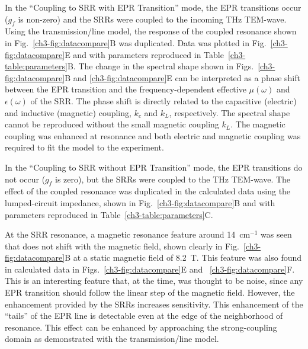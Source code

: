 In the ``Coupling to SRR with EPR Transition'' mode, the EPR transitions occur ($g_f$ is non-zero) and the SRRs were coupled to the incoming THz TEM-wave. Using the transmission\-/line model, the response of the coupled resonance shown in Fig.~\ref{ch3-fig:datacompare}B was duplicated. Data was plotted in Fig.~\ref{ch3-fig:datacompare}E and with parameters reproduced in Table~\ref{ch3-table:parameters}B. The change in the spectral shape shown in Figs.~\ref{ch3-fig:datacompare}B and \ref{ch3-fig:datacompare}E can be interpreted as a phase shift between the EPR transition and the frequency-dependent effective $\mu(\omega)$ and $\epsilon(\omega)$ of the SRR. The phase shift is directly related to the capacitive (electric) and inductive (magnetic) coupling, $k_c$ and $k_L$, respectively. The spectral shape cannot be reproduced without the small magnetic coupling $k_L$. The magnetic coupling was enhanced at resonance and both electric and magnetic coupling was required to fit the model to the experiment.

In the ``Coupling to SRR without EPR Transition'' mode, the EPR transitions do not occur ($g_f$ is zero), but the SRRs were coupled to the THz TEM-wave. The effect of the coupled resonance was duplicated in the calculated data using the lumped-circuit impedance, shown in Fig.~\ref{ch3-fig:datacompare}B and with parameters reproduced in Table~\ref{ch3-table:parameters}C. 

At the SRR resonance, a magnetic resonance feature around 14~cm$^{-1}$ was seen that does not shift with the magnetic field, shown clearly in Fig.~\ref{ch3-fig:datacompare}B at a static magnetic field of 8.2~T. This feature was also found in calculated data in Figs.~\ref{ch3-fig:datacompare}E and ~\ref{ch3-fig:datacompare}F. This is an interesting feature that, at the time, was thought to be noise, since any EPR transition should follow the linear step of the magnetic field. However, the enhancement provided by the SRRs increases sensitivity. This enhancement of the ``tails'' of the EPR line is detectable even at the edge of the neighborhood of resonance. This effect can be enhanced by approaching the strong-coupling domain as demonstrated with the transmission\-/line model.

